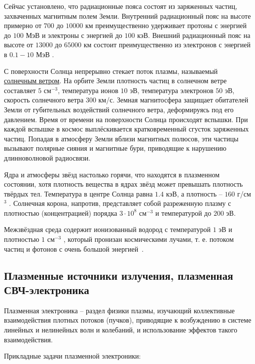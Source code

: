 \documentclass[10pt, a4paper]{article}
\begin{document}
Сейчас установлено, что радиационные пояса состоят из заряженных частиц, захваченных магнитным полем Земли. Внутренний радиационный пояс на высоте примерно от $700$ до $10000$ км преимущественно удерживает протоны с энергией до $100$ МэВ и электроны с энергией до $100$ кэВ. Внешний радиационный пояс на высоте от $13000$ до $65000$ км состоит преимущественно из электронов с энергией в $0.1-10$ МэВ .

С поверхности Солнца непрерывно стекает поток плазмы, называемый \uline{солнечным ветром}. На орбите Земли плотность частиц в солнечном ветре составляет $5$ см$^{-3}$, температура ионов $10$ эВ, температура электронов $50$ эВ, скорость солнечного ветра $300$ км/с. Земная магнитосфера защищает обитателей Земли от губительных воздействий солнечного ветра, деформируясь под его давлением. Время от времени на поверхности Солнца происходят вспышки. При каждой вспышке в космос выплёскивается кратковременный сгусток заряженных частиц. Попадая в атмосферу Земли вблизи магнитных полюсов, эти частицы вызывают полярные сияния и магнитные бури,
приводящие к нарушению длинноволновой радиосвязи.

Ядра и атмосферы звёзд настолько горячи, что находятся в плазменном состоянии, хотя плотность вещества в ядрах звёзд может превышать плотность твёрдых тел. Температура в центре Солнца равна $1.4$ кэВ, а плотность -- $160$ г/см$^3$ . Солнечная корона, напротив, представляет собой разреженную плазму с плотностью (концентрацией) порядка $3\cdot10^8$ см$^{-3}$ и температурой до $200$ эВ.

Межзвёздная среда содержит ионизованный водород с температурой $1$ эВ и плотностью $1$ см$^{-3}$ , который пронизан космическими лучами, т. е. потоком частиц и фотонов с очень большой
энергией~\cite{kotelnikov}.

\subsection{Плазменные источники излучения, плазменная СВЧ-электроника}

Плазменная электроника -- раздел физики плазмы, изучающий коллективные взаимодействия плотных потоков (пучков), приводящие к возбуждению в системе линейных и нелинейных волн и колебаний, и использование эффектов такого взаимодействия.

Прикладные задачи плазменной электроники:
\end{document}
